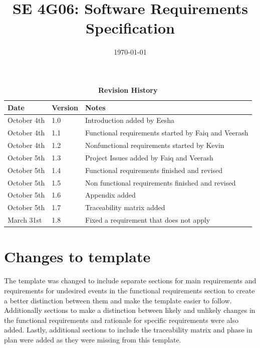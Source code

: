 \documentclass[12pt, titlepage]{article}
\title{SE 4G06: Software Requirements Specification\\\progname}
\author{\authname}
\date{\today}
\begin{document}
	
	\maketitle
	
	\tableofcontents
	\listoftables
	\listoffigures
	
	\begin{table}[H]
		\caption{\bf Revision History}
		\begin{tabularx}{\textwidth}{p{3cm}p{2cm}X}
			\toprule {\bf Date} & {\bf Version} & {\bf Notes}\\
			\midrule
			October 4th & 1.0 & Introduction added by Eesha\\
			October 4th & 1.1 & Functional requirements started by Faiq and Veerash\\
			October 4th & 1.2 & Nonfunctional requirements started by Kevin\\
			October 5th & 1.3 & Project Issues added by Faiq and Veerash \\
			October 5th & 1.4 & Functional requirements finished and revised \\
			October 5th & 1.5 & Non functional requirements finished and revised \\
			October 5th & 1.6 & Appendix added\\
			October 5th & 1.7 & Traceability matrix added\\
            March 31st & 1.8 & Fixed a requirement that does not apply\\
			\bottomrule
		\end{tabularx}
	\end{table}
	
	\newpage
	
	
	\section{Changes to template}
	
	The template was changed to include separate sections for main requirements and requirements for undesired events in the functional requirements section to create a better distinction between them and make the template easier to follow. Additionally sections to make a distinction between likely and unlikely changes in the functional requirements and rationale for specific requirements were also added. Lastly, additional sections to include the traceability matrix and phase in plan were added as they were missing from this template.
	
\end{document}
